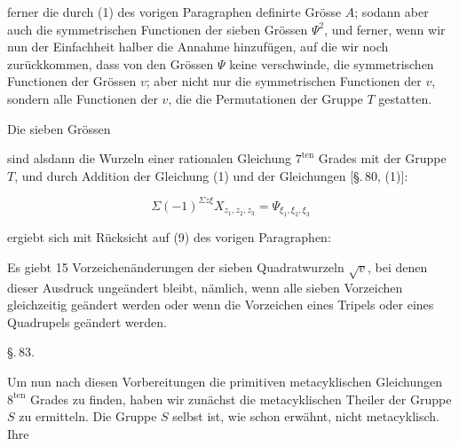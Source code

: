 ferner die durch (1) des vorigen Paragraphen definirte Grösse $A$; sodann aber auch die symmetrischen Functionen der sieben Grössen $\Psi^2$, und ferner, wenn wir nun der Einfachheit halber die Annahme hinzufügen, auf die wir noch zurückkommen, dass von den Grössen $\Psi$ keine verschwinde, die symmetrischen Functionen der Grössen $v$; aber nicht nur die symmetrischen Functionen der $v$, sondern alle Functionen der $v$, die die Permutationen der Gruppe $T$ gestatten.

Die sieben Grössen


sind alsdann die Wurzeln einer rationalen Gleichung $7^{\mathrm{ten}}$ Grades mit der Gruppe $T$, und durch Addition der Gleichung (1) und der Gleichungen [\S.\,80, (1)]:

\[
\Sigma (-1)^{\Sigma z\xi} X_{z_1, z_2, z_3} = \Psi_{\xi_1, \xi_2, \xi_3}
\]

ergiebt sich mit Rücksicht auf (9) des vorigen Paragraphen:


Es giebt 15 Vorzeichenänderungen der sieben Quadratwurzeln $\sqrt{v}$, bei denen dieser Ausdruck ungeändert bleibt, nämlich, wenn alle sieben Vorzeichen gleichzeitig geändert werden oder wenn die Vorzeichen eines Tripels oder eines Quadrupels geändert werden. 

\begin{center}
\S.\,83.

\end{center}

Um nun nach diesen Vorbereitungen die primitiven metacyklischen Gleichungen $8^{\mathrm{ten}}$ Grades zu finden, haben wir zunächst die metacyklischen Theiler der Gruppe $S$ zu ermitteln. Die Gruppe $S$ selbst ist, wie schon erwähnt, nicht metacyklisch. Ihre
